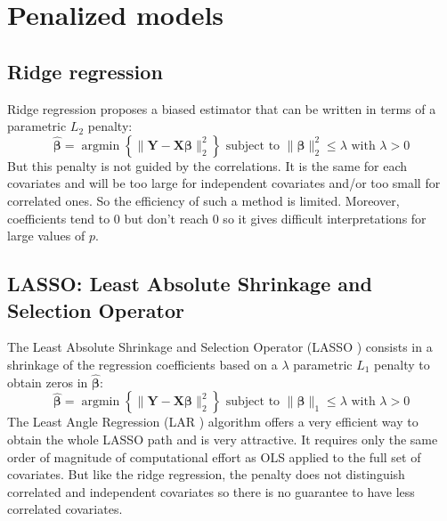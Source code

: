 \documentclass[11pt,a4paper]{report}
\begin{document}
	\section{Penalized models}
		\subsection{Ridge regression}
Ridge regression \cite{marquardt1975ridge} proposes a biased estimator that can be written in terms of a parametric $L_2$ penalty:
	\begin{equation}
		 \boldsymbol{\hat{\beta}}=\operatorname{argmin} \left\lbrace \parallel \boldsymbol{Y}-\boldsymbol{X\beta}\parallel_2^2 \right\rbrace \textrm{ subject to } \parallel \boldsymbol{\beta} \parallel_2^2\leq \lambda \textrm{ with } \lambda>0
	\end{equation}
	But this penalty is not guided by the correlations. It is the same for each covariates and will be too large for independent covariates and/or too small for correlated ones. So the efficiency of such a method is limited. 
	Moreover, coefficients tend to 0 but don't reach 0 so it gives difficult interpretations for large values of $p$. 
				
			
		\subsection{LASSO: Least Absolute Shrinkage and Selection Operator }
			\cite{tibshiranilasso}  
			\cite{tibshirani1996regression} 
			\cite{efron2004least} %
			\cite{Zhao2006MSC}%
			\cite{SAM10088}%
The Least Absolute Shrinkage and Selection Operator (\textsc{LASSO} \cite{tibshirani1996regression}) consists in a shrinkage of the regression coefficients based on a $\lambda$ parametric $L_1$ penalty to obtain zeros in $\hat{\boldsymbol{\beta}}$:
		\begin{equation}
		 \boldsymbol{\hat{\beta}}=\operatorname{argmin} \left\lbrace \parallel \boldsymbol{Y}-\boldsymbol{X\beta}\parallel_2^2 \right\rbrace \textrm{ subject to } \parallel\boldsymbol{\beta} \parallel_1\leq \lambda \textrm{ with } \lambda>0
		\end{equation}	
	 The Least Angle Regression (\textsc{LAR} \cite{efron2004least}) algorithm offers a very efficient way to obtain the whole LASSO path and is very attractive. It requires only the same order of magnitude of computational effort as \textsc{OLS} applied to the full set of covariates. But like the ridge regression, the penalty does not distinguish correlated and independent covariates so there is no guarantee to have less correlated covariates.
\end{document}
